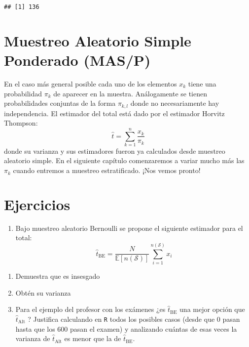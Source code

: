 \documentclass[
]{book}
\providecommand{\tightlist}{%
  \setlength{\itemsep}{0pt}\setlength{\parskip}{0pt}}
\begin{document}
\begin{verbatim}
## [1] 136
\end{verbatim}

\hypertarget{muestreo-aleatorio-simple-ponderado-masp}{%
\section{Muestreo Aleatorio Simple Ponderado (MAS/P)}\label{muestreo-aleatorio-simple-ponderado-masp}}

En el caso más general posible cada uno de los elementos \(x_k\) tiene una probabilidad \(\pi_k\) de aparecer en la muestra. Análogamente se tienen probabilidades conjuntas de la forma \(\pi_{k,l}\) donde no necesariamente hay independencia. El estimador del total está dado por el estimador Horvitz Thompson:
\[
\hat{t} = \sum\limits_{k = 1}^n \dfrac{x_k}{\pi_k}
\]
donde su varianza y sus estimadores fueron ya calculados desde muestreo aleatorio simple. En el siguiente capítulo comenzaremos a variar mucho más las \(\pi_k\) cuando entremos a muestreo estratificado. ¡Nos vemos pronto!

\hypertarget{ejercicios-1}{%
\section{Ejercicios}\label{ejercicios-1}}

\begin{enumerate}
\def\labelenumi{\arabic{enumi}.}
\tightlist
\item
  Bajo muestreo aleatorio Bernoulli se propone el siguiente estimador para el total:
  \[
  \hat{t}_{\text{BE}} = \dfrac{N}{\mathbb{E}[n(\mathcal{S})]} \sum\limits_{i = 1}^{n(\mathcal{S})} x_i
  \]
\end{enumerate}

\begin{enumerate}
\def\labelenumi{\alph{enumi}.}
\tightlist
\item
  Demuestra que es insesgado
\item
  Obtén su varianza
\item
  Para el ejemplo del profesor con los exámenes ¿es \(\hat{t}_{\text{BE}}\) una mejor opción que \(\hat{t}_{\text{Alt}}\) ? Justifica calculando en \texttt{R} todos los posibles casos (desde que \(0\) pasan hasta que los \(600\) pasan el examen) y analizando cuántas de esas veces la varianza de \(\hat{t}_{\text{Alt}}\) es menor que la de \(\hat{t}_{\text{BE}}\).
\end{enumerate}
\end{document}
